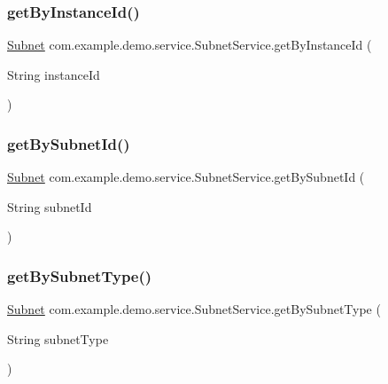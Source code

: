 \subsubsection{\texorpdfstring{get\+By\+Instance\+Id()}{getByInstanceId()}}
{\footnotesize\ttfamily \mbox{\hyperlink{classcom_1_1example_1_1demo_1_1modular_1_1_subnet}{Subnet}} com.\+example.\+demo.\+service.\+Subnet\+Service.\+get\+By\+Instance\+Id (\begin{DoxyParamCaption}\item[{String}]{instance\+Id }\end{DoxyParamCaption})}

\mbox{\label{classcom_1_1example_1_1demo_1_1service_1_1_subnet_service_a74378dd66dff283b66bff375e65d5d27}} 
\subsubsection{\texorpdfstring{get\+By\+Subnet\+Id()}{getBySubnetId()}}
{\footnotesize\ttfamily \mbox{\hyperlink{classcom_1_1example_1_1demo_1_1modular_1_1_subnet}{Subnet}} com.\+example.\+demo.\+service.\+Subnet\+Service.\+get\+By\+Subnet\+Id (\begin{DoxyParamCaption}\item[{String}]{subnet\+Id }\end{DoxyParamCaption})}

\mbox{\label{classcom_1_1example_1_1demo_1_1service_1_1_subnet_service_ac4dd42bb56acf8f4ec1bdcff60475c70}} 
\subsubsection{\texorpdfstring{get\+By\+Subnet\+Type()}{getBySubnetType()}}
{\footnotesize\ttfamily \mbox{\hyperlink{classcom_1_1example_1_1demo_1_1modular_1_1_subnet}{Subnet}} com.\+example.\+demo.\+service.\+Subnet\+Service.\+get\+By\+Subnet\+Type (\begin{DoxyParamCaption}\item[{String}]{subnet\+Type }\end{DoxyParamCaption})}


